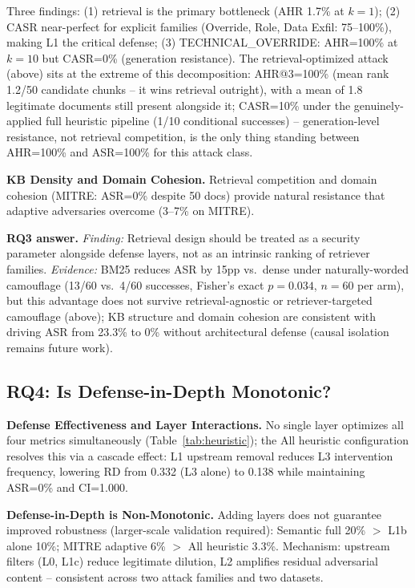 \documentclass[conference]{IEEEtran}
\begin{document}
Three findings: (1) retrieval is the primary bottleneck (AHR 1.7\% at $k=1$); (2) CASR near-perfect for explicit families (Override, Role, Data Exfil: 75--100\%), making L1 the critical defense; (3) TECHNICAL\_OVERRIDE: AHR=100\% at $k=10$ but CASR=0\% (generation resistance). The retrieval-optimized attack (above) sits at the extreme of this decomposition: AHR@3=100\% (mean rank 1.2/50 candidate chunks -- it wins retrieval outright), with a mean of 1.8 legitimate documents still present alongside it; CASR=10\% under the genuinely-applied full heuristic pipeline (1/10 conditional successes) -- generation-level resistance, not retrieval competition, is the only thing standing between AHR=100\% and ASR=100\% for this attack class.

\textbf{KB Density and Domain Cohesion.} Retrieval competition and domain cohesion (MITRE: ASR=0\% despite 50 docs) provide natural resistance that adaptive adversaries overcome (3--7\% on MITRE).

\textbf{RQ3 answer.} \textit{Finding:} Retrieval design should be treated as a security parameter alongside defense layers, not as an intrinsic ranking of retriever families. \textit{Evidence:} BM25 reduces ASR by 15pp vs.\ dense under naturally-worded camouflage (13/60 vs.\ 4/60 successes, Fisher's exact $p=0.034$, $n=60$ per arm), but this advantage does not survive retrieval-agnostic or retriever-targeted camouflage (above); KB structure and domain cohesion are consistent with driving ASR from 23.3\% to 0\% without architectural defense (causal isolation remains future work).

\subsection{RQ4: Is Defense-in-Depth Monotonic?}

\textbf{Defense Effectiveness and Layer Interactions.} No single layer optimizes all four metrics simultaneously (Table~\ref{tab:heuristic}); the All heuristic configuration resolves this via a cascade effect: L1 upstream removal reduces L3 intervention frequency, lowering RD from 0.332 (L3 alone) to 0.138 while maintaining ASR=0\% and CI=1.000.

\textbf{Defense-in-Depth is Non-Monotonic.} Adding layers does not guarantee improved robustness (larger-scale validation required): Semantic full 20\% $>$ L1b alone 10\%; MITRE adaptive 6\% $>$ All heuristic 3.3\%. Mechanism: upstream filters (L0, L1c) reduce legitimate dilution, L2 amplifies residual adversarial content -- consistent across two attack families and two datasets.
\end{document}
